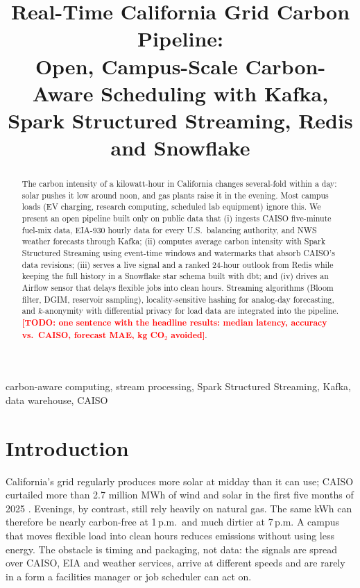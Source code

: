 \documentclass[conference]{IEEEtran}
\newcommand{\TODO}[1]{\textcolor{red}{\textbf{[TODO: #1]}}}   %
\begin{document}
\title{Real-Time California Grid Carbon Pipeline:\\Open, Campus-Scale Carbon-Aware Scheduling with Kafka, Spark Structured Streaming, Redis and Snowflake}
\author{
}
\maketitle

\begin{abstract}
The carbon intensity of a kilowatt-hour in California changes several-fold within a day: solar pushes it low around noon, and gas plants raise it in the evening. Most campus loads (EV charging, research computing, scheduled lab equipment) ignore this. We present an open pipeline built only on public data that (i) ingests CAISO five-minute fuel-mix data, EIA-930 hourly data for every U.S.\ balancing authority, and NWS weather forecasts through Kafka; (ii) computes average carbon intensity with Spark Structured Streaming using event-time windows and watermarks that absorb CAISO's data revisions; (iii) serves a live signal and a ranked 24-hour outlook from Redis while keeping the full history in a Snowflake star schema built with dbt; and (iv) drives an Airflow sensor that delays flexible jobs into clean hours. Streaming algorithms (Bloom filter, DGIM, reservoir sampling), locality-sensitive hashing for analog-day forecasting, and $k$-anonymity with differential privacy for load data are integrated into the pipeline. \TODO{one sentence with the headline results: median latency, accuracy vs.\ CAISO, forecast MAE, kg CO$_2$ avoided}.
\end{abstract}
\begin{IEEEkeywords}
carbon-aware computing, stream processing, Spark Structured Streaming, Kafka, data warehouse, CAISO
\end{IEEEkeywords}

\section{Introduction}
California's grid regularly produces more solar at midday than it can use; CAISO curtailed more than 2.7 million MWh of wind and solar in the first five months of 2025 \cite{caiso-curtail}. Evenings, by contrast, still rely heavily on natural gas. The same kWh can therefore be nearly carbon-free at 1\,p.m.\ and much dirtier at 7\,p.m. A campus that moves flexible load into clean hours reduces emissions without using less energy.
The obstacle is timing and packaging, not data: the signals are spread over CAISO, EIA and weather services, arrive at different speeds and are rarely in a form a facilities manager or job scheduler can act on.
\end{document}
